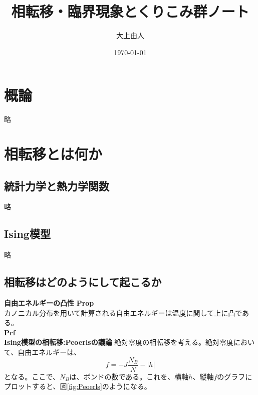 \documentclass[a4paper,11pt]{jsarticle}
\numberwithin{equation}{section}
\begin{document}
\title{相転移・臨界現象とくりこみ群ノート}
\author{大上由人}
\date{\today}
\maketitle
\section{概論}
略

\section{相転移とは何か}
\subsection{統計力学と熱力学関数}
略

\subsection{Ising模型}
略

\subsection{相転移はどのようにして起こるか}
\textbf{自由エネルギーの凸性}
\textbf{Prop}\\
カノニカル分布を用いて計算される自由エネルギーは温度に関して上に凸である。\\
\textbf{Prf}\\

\textbf{Ising模型の相転移:Peoerlsの議論}
絶対零度の相転移を考える。絶対零度において、自由エネルギーは、
\begin{equation}
    f = -J\frac{N_B}{N}-|h|
\end{equation}
となる。ここで、$N_B$は、ボンドの数である。これを、横軸$h$、縦軸$f$のグラフにプロットすると、図\ref{fig:Peoerls}のようになる。
\end{document}
